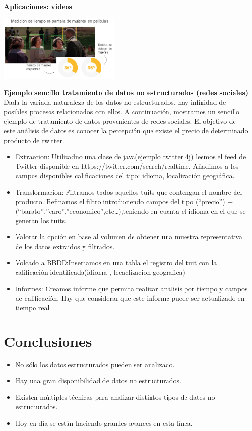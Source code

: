 \documentclass[twoside,twocolumn]{article}
\begin{document}
\textbf{Aplicaciones: videos}\\
\begin{center}
	\includegraphics[width=6cm]{./img/bd7.png} 
\end{center}

\textbf{Ejemplo sencillo tratamiento de datos no estructurados (redes sociales)}\\
Dada la variada naturaleza de los datos no estructurados, hay infinidad de posibles procesos relacionados con ellos. A continuación, mostramos un sencillo ejemplo de tratamiento de datos provenientes de redes sociales.
El objetivo de este análisis de datos es conocer la percepción que existe el precio de determinado producto de twitter.
\begin{itemize}
    \item Extraccion: Utilizadno una clase de java(ejemplo twitter 4j) leemos el feed de Twitter disponible en https://twitter.com/search/realtime. Añadimos a los campos disponibles calificaciones del tipo: idioma, localización geográfica.
    \item Transformacion: Filtramos todos aquellos tuits que contengan el nombre del producto. Refinamos el filtro introduciendo campos del tipo (“precio”) + (“barato”,”caro”,”economico”,etc…),teniendo en cuenta el idioma en el que se generan los tuits.
    \item Valorar la opción en base al volumen de obtener una muestra representativa de los datos extraidos y filtrados.
    \item Volcado a BBDD:Insertamos en una tabla el registro del tuit con la calificación identificada(idioma , locaclizacion geografica)
    \item Informes: Creamos informe que permita realizar análisis por tiempo y campos de calificación. Hay que considerar que este informe puede ser actualizado en tiempo real.
\end{itemize}


\section{Conclusiones}
\begin{itemize}
    \item No sólo los datos estructurados pueden ser analizado. 
    \item Hay una gran disponibilidad de datos no estructurados. 
    \item Existen múltiples técnicas para analizar distintos tipos de datos no estructurados. 
    \item Hoy en día se están haciendo grandes avances en esta línea.
\end{itemize}
\end{document}
